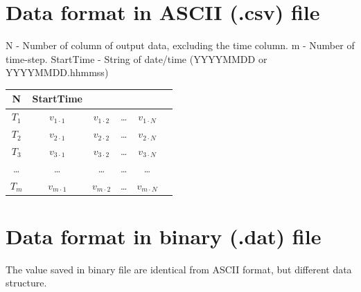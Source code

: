 \documentclass[]{scrbook}
\begin{document}
\section{Data format in ASCII (.csv)
file}\label{data-format-in-ascii-.csv-file}

N - Number of column of output data, excluding the time column. m -
Number of time-step. StartTime - String of date/time (YYYYMMDD or
YYYYMMDD.hhmmss)

\begin{longtable}[]{@{}cccccc@{}}
\toprule
N & StartTime & & & &\tabularnewline
\midrule
\endhead
\(T_1\) & \(v_{1 \cdot 1}\) & \(v_{1 \cdot 2}\) & \ldots{} &
\(v_{1 \cdot N}\) &\tabularnewline
\(T_2\) & \(v_{2 \cdot 1}\) & \(v_{2 \cdot 2}\) & \ldots{} &
\(v_{2 \cdot N}\) &\tabularnewline
\(T_3\) & \(v_{3 \cdot 1}\) & \(v_{3 \cdot 2}\) & \ldots{} &
\(v_{3 \cdot N}\) &\tabularnewline
\ldots{} & \ldots{} & \ldots{} & \ldots{} & \ldots{} &\tabularnewline
\(T_{m}\) & \(v_{m \cdot 1}\) & \(v_{m \cdot 2}\) & \ldots{} &
\(v_{m \cdot N}\) &\tabularnewline
\bottomrule
\end{longtable}

\section{Data format in binary (.dat)
file}\label{data-format-in-binary-.dat-file}

The value saved in binary file are identical from ASCII format, but
different data structure.
\end{document}
